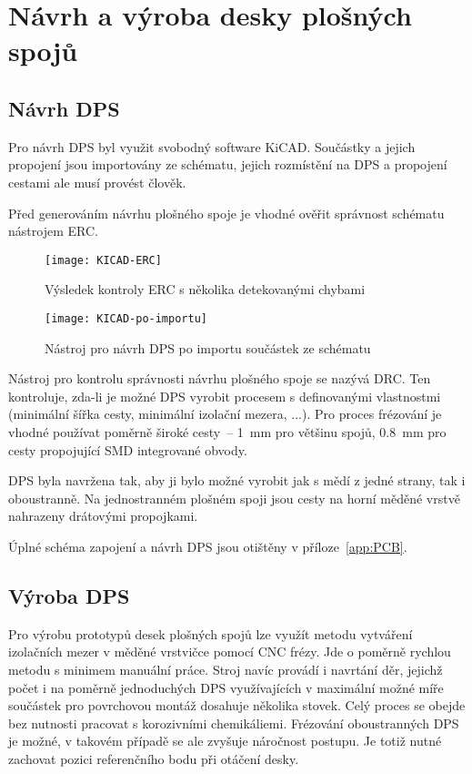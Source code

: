 \section{Návrh a výroba desky plošných spojů}
\subsection{Návrh DPS}
Pro návrh DPS byl využit svobodný software KiCAD. Součástky a jejich propojení
jsou importovány ze schématu, jejich rozmístění na DPS a propojení cestami ale
musí provést člověk.

Před generováním návrhu plošného spoje je vhodné ověřit správnost schématu
nástrojem \ac{ERC}.

\begin{figure}[htbp]
    \centering
    \texttt{[image: KICAD-ERC]}
    \caption{Výsledek kontroly \acs{ERC} s několika detekovanými chybami}
    \label{fig:kicad ERC}
\end{figure}

\begin{figure}[htbp]
    \centering
    \texttt{[image: KICAD-po-importu]}
    \caption{%
        Nástroj pro návrh DPS  po importu součástek ze
        schématu
    }
    \label{fig:kicad po importu}
\end{figure}

Nástroj pro kontrolu správnosti návrhu plošného spoje se nazývá \ac{DRC}. Ten
kontroluje, zda-li je možné DPS vyrobit procesem s definovanými vlastnostmi
(minimální šířka cesty, minimální izolační mezera, ...). Pro proces frézování
je vhodné používat poměrně široké cesty~-- \SI{1}{\milli\meter} pro většinu
spojů, \SI{0,8}{\milli\meter} pro cesty propojující SMD integrované obvody.

DPS byla navržena tak, aby ji bylo možné vyrobit jak s mědí z jedné strany,
tak i oboustranně. Na jednostranném plošném spoji jsou cesty na horní měděné
vrstvě nahrazeny drátovými propojkami.

Úplné schéma zapojení a návrh DPS jsou otištěny v příloze~\ref{app:PCB}.


\subsection{Výroba DPS}
Pro výrobu prototypů desek plošných spojů lze využít metodu vytváření
izolačních mezer v měděné vrstvičce pomocí CNC frézy. Jde o poměrně rychlou
metodu s minimem manuální práce. Stroj navíc provádí i navrtání děr, jejichž
počet i na poměrně jednoduchých DPS využívajících v maximální možné míře
součástek pro povrchovou montáž dosahuje několika stovek. Celý proces se obejde
bez nutnosti pracovat s korozivními chemikáliemi. Frézování oboustranných DPS
je možné, v takovém případě se ale zvyšuje náročnost postupu. Je totiž nutné
zachovat pozici referenčního bodu při otáčení desky.

